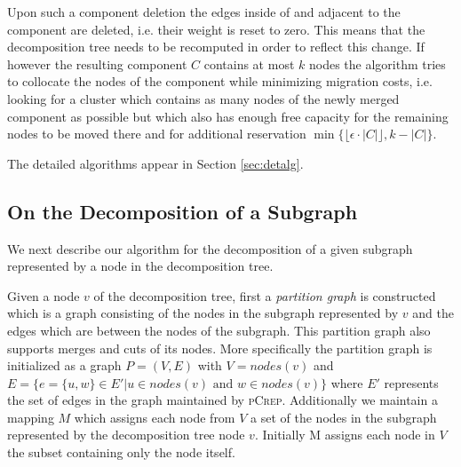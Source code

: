 \documentclass[a4paper,UKenglish,cleveref, autoref, thm-restate,authorcolumns]{lipics-v2019}
\newcommand{\adjDel}{\textsc{pCrep}}
\begin{document}
Upon such a component deletion the edges inside of and adjacent to the component are deleted, i.e. their weight is reset to zero. This means that the decomposition tree needs to be recomputed in order to reflect this change.
If however the resulting component $C$ contains at most $k$ nodes the algorithm tries to collocate the nodes of the component while minimizing migration costs, i.e. looking for a cluster which contains as many nodes of the newly merged component as possible but which also has enough free capacity for the remaining nodes to be moved there and for additional reservation $\min\{\lfloor\epsilon\cdot|C|\rfloor,k-|C|\}$.


The detailed algorithms appear in Section
\ref{sec:detalg}.

\subsection{On the Decomposition of a Subgraph}
\label{decomp_desc}

We next describe our algorithm for the decomposition of a given subgraph represented by a node in the decomposition tree. 

Given a node $v$ of the decomposition tree, first a \textit{partition graph} is constructed which is a graph consisting of the nodes in the subgraph represented by $v$ and the edges which are between the nodes of the subgraph. This partition graph also supports merges and cuts of its nodes. More specifically the partition graph is initialized as a graph $P=(V,E)$ with $V=nodes(v)$ and $E=\{e=\{u,w\}\in E'|u\in nodes(v)\text{ and }w\in nodes(v)\}$ where $E'$ represents the set of edges in the graph maintained by \adjDel{}. Additionally we maintain a mapping $M$ which assigns each node from $V$ a set of the nodes in the subgraph represented by the decomposition tree node $v$. Initially M assigns each node in $V$ the subset containing only the node itself.
\end{document}
